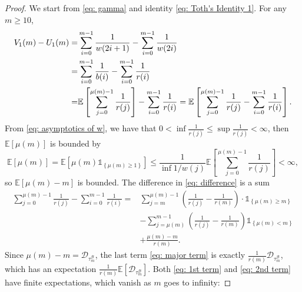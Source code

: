 \documentclass[twoside,12pt, a4paper]{article}
\numberwithin{equation}{section}
\theoremstyle{remark}
\begin{document}
	\begin{proof} 
		We start from \eqref{eq: gamma} and identity \eqref{eq: Toth's Identity 1}. For any $m \geq 10$,
		\begin{align}
			V_1(m) - U_1(m) =& \sum_{i=0}^{m-1} \frac{1}{w(2i+1)} -\sum_{i=0}^{m-1} \frac{1}{w(2i)} 
			\notag \\
			=& \sum_{i=0}^{m-1} \frac{1}{b(i)} -\sum_{i=0}^{m-1} \frac{1}{r(i)} 
			\notag \\
			=& 	\mathbb{E}\left[  \sum_{j=0}^{ \mu(m)-1 } \frac{1}{r(j)}   \right] - \sum_{i=0}^{m-1} \frac{1}{r(i)} = \mathbb{E}\left[  \sum_{j=0}^{ \mu(m)-1 } \frac{1}{r(j)}    - \sum_{i=0}^{m-1} \frac{1}{r(i)}\right]. \label{eq: difference}
		\end{align}
		From \eqref{eq: asymptotics of w}, we have that $0< \inf \frac{1}{r(j)} \leq \sup \frac{1}{r(j)} <\infty $, then $\mathbb{E}\left[\mu(m)\right]$ is bounded by
		$$\mathbb{E}\left[ \mu(m) \right] = \mathbb{E}\left[ \mu(m)\mathbb{1}_{\left\{\mu(m)\geq 1 \right\} } \right] \leq  \frac{1}{\inf 1/w(j) }\mathbb{E}\left[  \sum_{j=0}^{ \mu(m)-1 } \frac{1}{r(j)}   \right] <\infty, $$ 
		so $ \mathbb{E}\left[ \mu(m) -m\right]  $ is bounded.
		The difference in \eqref{eq: difference} is a sum
		\begin{align} 
			\sum_{j=0}^{ \mu(m)-1 } \frac{1}{r(j)} - \sum_{i=0}^{m-1} \frac{1}{r(i)} =& \sum_{j=m}^{\mu(m)-1} \left(\frac{1}{r(j)} -\frac{1}{r(m)} \right) \cdot\mathbb{1}_{\left\{\mu(m)\geq m\right\}} 
			\label{eq: 1st term}
			\\	
			& - \sum_{j=\mu(m)}^{m-1} \left(\frac{1}{r(j)} -\frac{1}{r(m)} \right) \mathbb{1}_{\left\{\mu(m)< m\right\}} 
			\label{eq: 2nd term}
			\\
			& + \frac{\mu(m)-m}{ r(m) }. \label{eq: major term}
		\end{align} 
		Since $\mu(m)-m = \mathcal{D}_{\tau^{\mathcal{B}}_m}$, the last term \eqref{eq: major term} is exactly $\frac{1}{r(m)} \mathcal{D}_{\tau^{\mathcal{B}}_m}$, which has an expectation $\frac{1}{r(m)} \mathbb{E}\left[\mathcal{D}_{\tau^{\mathcal{B}}_m}\right].$ Both \eqref{eq: 1st term} and \eqref{eq: 2nd term} have finite expectations, which vanish as $m$ goes to infinity:
		

\end{proof}
\end{document}
